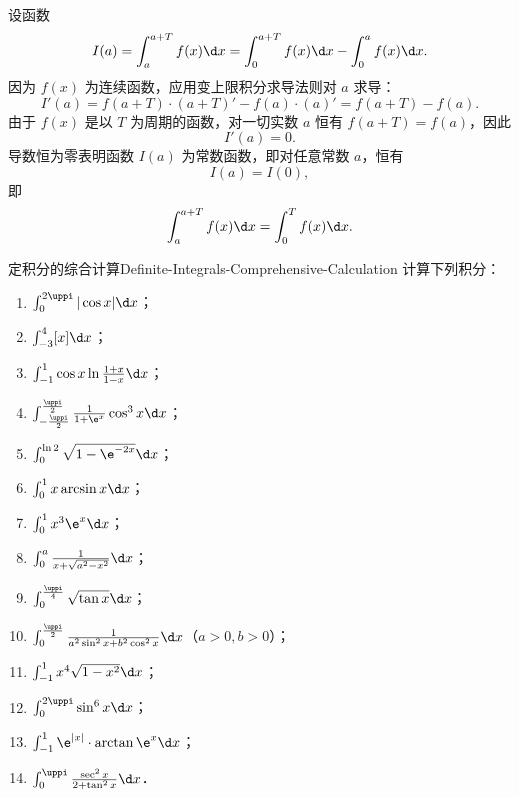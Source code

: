 \begin{myproof}
    设函数
    \begin{equation}
        I(a) = \int_a^{a+T} f(x) \d x = \int_0^{a+T} f(x) \d x - \int_0^a f(x) \d x.
    \end{equation}
    因为 $f(x)$ 为连续函数，应用变上限积分求导法则对 $a$ 求导：
    \begin{equation}
        I'(a) = f(a + T) \cdot (a + T)' - f(a) \cdot (a)' = f(a + T) - f(a).
    \end{equation}
    由于 $f(x)$ 是以 $T$ 为周期的函数，对一切实数 $a$ 恒有 $f(a + T) = f(a)$，因此
    \begin{equation}
        I'(a) = 0.
    \end{equation}
    导数恒为零表明函数 $I(a)$ 为常数函数，即对任意常数 $a$，恒有
    \begin{equation}
        I(a) = I(0),
    \end{equation}
    即
    \begin{equation}
        \int_a^{a+T} f(x) \d x = \int_0^T f(x) \d x.
    \end{equation}
\end{myproof}

\begin{problem}{定积分的综合计算}{Definite-Integrals-Comprehensive-Calculation}
    计算下列积分：
    \begin{enumerate}
        \item $\int_0^{2\uppi} |\cos x| \d x$；
        \item $\int_{-3}^4 [x] \d x$；
        \item $\int_{-1}^1 \cos x \ln\frac{1 + x}{1 - x} \d x$；
        \item $\int_{-\frac{\uppi}{2}}^{\frac{\uppi}{2}} \frac{1}{1 + \e^x} \cos^3 x \d x$；
        \item $\int_0^{\ln 2} \sqrt{1 - \e^{-2x}} \d x$；
        \item $\int_0^1 x \arcsin x \d x$；
        \item $\int_0^1 x^3 \e^x \d x$；
        \item $\int_0^a \frac{1}{x + \sqrt{a^2 - x^2}} \d x$；
        \item $\int_0^{\frac{\uppi}{4}} \sqrt{\tan x} \d x$；
        \item $\int_0^{\frac{\uppi}{2}} \frac{1}{a^2 \sin^2 x + b^2 \cos^2 x} \d x$（$a > 0, b > 0$）；
        \item $\int_{-1}^1 x^4 \sqrt{1 - x^2} \d x$；
        \item $\int_0^{2\uppi} \sin^6 x \d x$；
        \item $\int_{-1}^1 \e^{|x|} \cdot \arctan \e^x \d x$；
        \item $\int_0^{\uppi} \frac{\sec^2 x}{2 + \tan^2 x} \d x$．
    \end{enumerate}
\end{problem}

